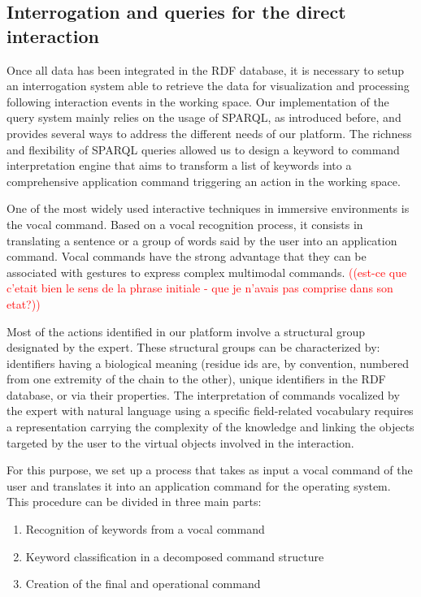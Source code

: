 \documentclass{vgtc}                          %
\newcommand*\mvb[1]{\textcolor{red}{#1}}
\begin{document}
\subsection{Interrogation and queries for the direct interaction}

Once all data has been integrated in the RDF database, it is necessary to setup an interrogation system able to retrieve the data for visualization and processing following interaction events in the working space. Our implementation of the query system mainly relies on the usage of SPARQL, as introduced before, and provides several ways to address the different needs of our platform. The richness and flexibility of SPARQL queries  allowed us to design a keyword to command interpretation engine that aims to transform a list of keywords into a comprehensive application command triggering an action in the working space.

One of the most widely used interactive techniques in immersive environments is the vocal command. Based on a vocal recognition process, it consists in translating a sentence or a group of words said by the user into an application command. Vocal commands have the strong advantage that they can be associated with gestures to express complex multimodal commands. \mvb{((est-ce que c'etait bien le sens de la phrase initiale - que je n'avais pas comprise dans son etat?))}

Most of the actions identified in our platform involve a structural group designated by the expert. These structural groups can be characterized by: identifiers having a biological meaning (residue ids are, by convention, numbered from one extremity of the chain to the other), unique identifiers in the RDF database, or via their properties.
The interpretation of commands vocalized by the expert with natural language using a specific field-related vocabulary requires a representation carrying the complexity of the knowledge and linking the objects targeted by the user to the virtual objects involved in the interaction.

For this purpose, we set up a process that takes as input a vocal command of the user and translates it into an application command for the operating system. This procedure can be divided in three main parts:

\begin{enumerate}
  \item Recognition of keywords from a vocal command
  \item Keyword classification in a decomposed command structure
  \item Creation of the final and operational command
\end{enumerate}
\end{document}
